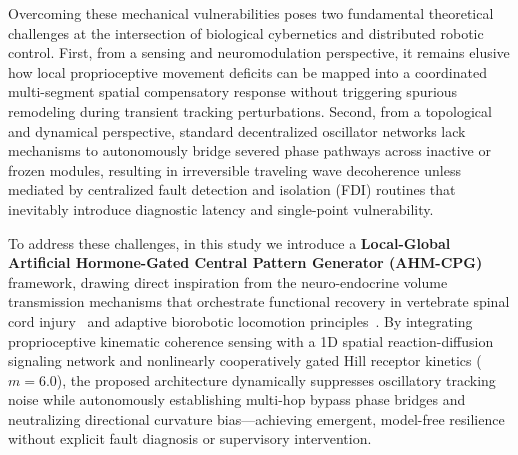\documentclass{iopjournal}
\begin{document}
Overcoming these mechanical vulnerabilities poses two fundamental theoretical challenges at the intersection of biological cybernetics and distributed robotic control. First, from a sensing and neuromodulation perspective, it remains elusive how local proprioceptive movement deficits can be mapped into a coordinated multi-segment spatial compensatory response without triggering spurious remodeling during transient tracking perturbations. Second, from a topological and dynamical perspective, standard decentralized oscillator networks lack mechanisms to autonomously bridge severed phase pathways across inactive or frozen modules, resulting in irreversible traveling wave decoherence unless mediated by centralized fault detection and isolation (FDI) routines that inevitably introduce diagnostic latency and single-point vulnerability.

To address these challenges, in this study we introduce a \textbf{Local-Global Artificial Hormone-Gated Central Pattern Generator (AHM-CPG)} framework, drawing direct inspiration from the neuro-endocrine volume transmission mechanisms that orchestrate functional recovery in vertebrate spinal cord injury~\cite{courtine2008,rossignol2011,bargmann2012} and adaptive biorobotic locomotion principles~\cite{wang2026,manoonpong2007,manoonpong2013,ijspeert2008}. By integrating proprioceptive kinematic coherence sensing with a 1D spatial reaction-diffusion signaling network and nonlinearly cooperatively gated Hill receptor kinetics ($m=6.0$), the proposed architecture dynamically suppresses oscillatory tracking noise while autonomously establishing multi-hop bypass phase bridges and neutralizing directional curvature bias—achieving emergent, model-free resilience without explicit fault diagnosis or supervisory intervention.
\end{document}
